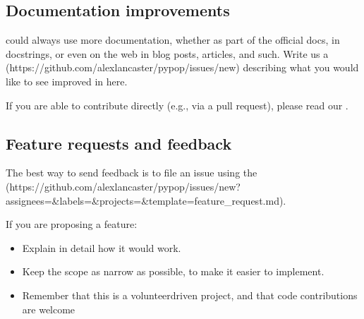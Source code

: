 \documentclass[letterpaper,10pt,english,openany,oneside]{sphinxmanual}
\begin{document}
\subsection{Documentation improvements}
\label{\detokenize{docs/guide-chapter-contributing:documentation-improvements}}
\sphinxAtStartPar
{} could always use more documentation, whether as part of the
official docs, in docstrings, or even on the web in blog posts,
articles, and such. Write us a  (https://github.com/alexlancaster/pypop/issues/new) describing what
you would like to see improved in here.

\sphinxAtStartPar
If you are able to contribute directly (e.g., via a pull request), please read
our {\hyperref[\detokenize{docs/guide-chapter-contributing:making-a-documentation-or-website-contribution}]{}}.


\subsection{Feature requests and feedback}
\label{\detokenize{docs/guide-chapter-contributing:feature-requests-and-feedback}}
\sphinxAtStartPar
The best way to send feedback is to file an issue using the  (https://github.com/alexlancaster/pypop/issues/new?assignees=\&labels=\&projects=\&template=feature\_request.md).

\sphinxAtStartPar
If you are proposing a feature:
\begin{itemize}
\item {} 
\sphinxAtStartPar
Explain in detail how it would work.

\item {} 
\sphinxAtStartPar
Keep the scope as narrow as possible, to make it easier to implement.

\item {} 
\sphinxAtStartPar
Remember that this is a volunteer\sphinxhyphen{}driven project, and that code contributions are welcome

\end{itemize}
\end{document}
